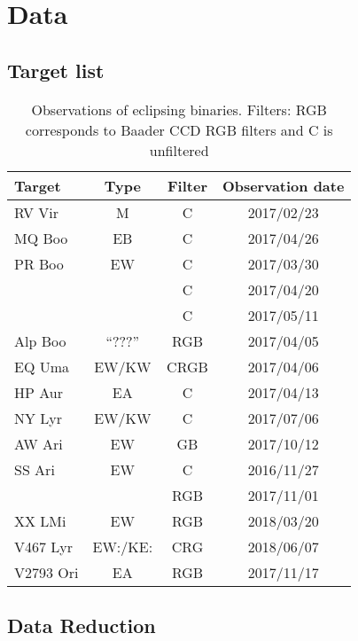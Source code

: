 \chapter{Data}

\section{Target list}
\begin{table}
    \centering
    \begin{tabular}[h]{l c c c}
    \toprule
    Target      & Type  & Filter    & Observation date \\ \bottomrule
    RV Vir      & M     & C         & 2017/02/23 \\ \midrule
    MQ Boo      & EB    & C         & 2017/04/26 \\ \midrule
    PR Boo      & EW    & C         & 2017/03/30 \\ \midrule
                &       & C         & 2017/04/20 \\ \midrule
                &       & C         & 2017/05/11 \\ \midrule
    Alp Boo     & ``???''   & RGB       & 2017/04/05 \\ \midrule
    EQ Uma      & EW/KW & CRGB      & 2017/04/06 \\ \midrule
    HP Aur      & EA    & C         & 2017/04/13 \\ \midrule
    NY Lyr      & EW/KW & C         & 2017/07/06 \\ \midrule
    AW Ari      & EW    & GB        & 2017/10/12 \\ \midrule
    SS Ari      & EW    & C         & 2016/11/27 \\ \midrule
                &       & RGB       & 2017/11/01 \\ \midrule
    XX LMi      & EW    & RGB       & 2018/03/20 \\ \midrule
    V467 Lyr    & EW:/KE:& CRG   & 2018/06/07 \\ \midrule
    V2793 Ori   & EA    & RGB   & 2017/11/17 \\
    \bottomrule
    \end{tabular}
    \caption{Observations of eclipsing binaries. Filters: RGB corresponds to Baader CCD RGB filters and C is unfiltered}\label{tab:observations}
\end{table}

\section{Data Reduction}

